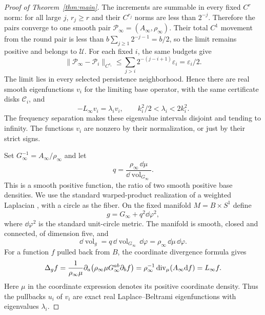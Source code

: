 \begin{proof}[Proof of Theorem~\ref{thm:main}]
The increments are summable in every fixed $C^r$ norm: for all
large $j$, $r_j\ge r$ and their $C^{r_j}$ norms are less than
$2^{-j}$. Therefore the pairs converge to one smooth pair
$\mathcal P_\infty=(A_\infty,\rho_\infty)$. Their total $C^1$
movement from the round pair is less than
$b\sum_{j\ge1}2^{-j-1}=b/2$, so the limit remains positive and
belongs to $\mathcal U$. For each fixed $i$, the same budgets give
\[
 \lVert\mathcal P_\infty-\mathcal P_i\rVert_{C^{s_i}}
 \le\sum_{j>i}2^{-(j-i+1)}\varepsilon_i
 =\varepsilon_i/2.
\]
The limit lies in every selected persistence neighborhood. Hence
there are real smooth eigenfunctions $v_i$ for the limiting base
operator, with the same certificate disks $\mathcal C_i$, and
\begin{equation}\label{eq:limiting-eigenvalue-intervals}
 -L_\infty v_i=\lambda_i v_i,\qquad
 k_i^2/2<\lambda_i<2k_i^2.
\end{equation}
The frequency separation makes these eigenvalue intervals disjoint
and tending to infinity. The functions $v_i$ are nonzero by their
normalization, or just by their strict signs.

Set $G_\infty^{-1}=A_\infty/\rho_\infty$ and let
\[
 q=\frac{\rho_\infty\,\dd\mu}{\dd\operatorname{vol}_{G_\infty}}.
\]
This is a smooth positive function, the ratio of two smooth
positive base densities. We use the standard warped-product
realization of a weighted Laplacian
\cite[Section~4, equation~(2)]{CharalambousLu2015}, with a circle
as the fiber. On the fixed manifold $M=B\times S^1$
define
\begin{equation}\label{eq:circle-metric}
 g=G_\infty+q^2\dd\varphi^2,
\end{equation}
where $\dd\varphi^2$ is the standard unit-circle metric. The
manifold is smooth, closed and connected, of dimension five, and
\[
 \dd\operatorname{vol}_g
 =q\,\dd\operatorname{vol}_{G_\infty}\,\dd\varphi
 =\rho_\infty\,\dd\mu\,\dd\varphi.
\]
For a function $f$ pulled back from $B$, the coordinate divergence
formula gives
\begin{equation}\label{eq:circle-operator}
 \Delta_g f
 =\frac{1}{\rho_\infty\mu}
   \partial_a\bigl(\rho_\infty\mu
                    G_\infty^{ab}\partial_b f\bigr)
 =\rho_\infty^{-1}\operatorname{div}_\mu(A_\infty\mathrm d f)
 =L_\infty f.
\end{equation}
Here $\mu$ in the coordinate expression denotes its positive
coordinate density. Thus the pullbacks $u_i$ of $v_i$ are exact
real Laplace--Beltrami eigenfunctions with eigenvalues
$\lambda_i$.


\end{proof}
